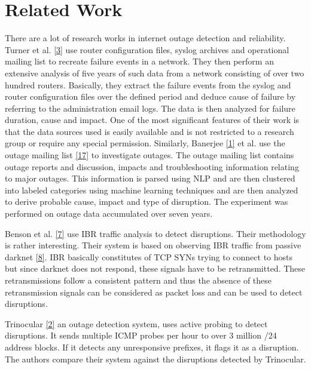 \documentclass[11pt,twoside,a4paper]{article}
\begin{document}
\section{Related Work}\label{RW}
There are a lot of research works in internet outage detection and reliability. Turner et al. \hyperlink {K3} {[3]} use router configuration files, syslog archives and operational mailing list to recreate failure events in a network. They then perform an extensive analysis of five years of such data from a network consisting of over two hundred routers. Basically, they extract the failure events from the syslog and router configuration files over the defined period and deduce cause of failure by referring to the administration email logs. The data is then analyzed for failure duration, cause and impact. One of the most significant features of their work is that the data sources used is easily available and is not restricted to a research group or require any special permission. Similarly, Banerjee \hyperlink {K1} {[1]} et al. use the outage mailing list \hyperlink{K17}{[17]} to investigate outages. The outage mailing list contains outage reports and discussion, impacts and troubleshooting information relating to major outages. This information is parsed using NLP and are then clustered into labeled categories using machine learning techniques and are then analyzed to derive probable cause, impact and type of disruption. The experiment was performed on outage data accumulated over seven years.

Benson et al. \hyperlink {K7} {[7]} use IBR traffic analysis to detect disruptions. Their methodology is rather interesting. Their system is based on observing IBR traffic from passive darknet \hyperlink {K8} {[8]}. IBR basically constitutes of TCP SYNs trying to connect to hosts but since darknet does not respond, these signals have to be retransmitted. These retransmissions follow a consistent pattern and thus the absence of these retransmission signals can be considered as packet loss and can be used to detect disruptions.

Trinocular \hyperlink {K2} {[2]} an outage detection system, uses active probing to detect disruptions. It sends multiple ICMP probes per hour to over 3 million /24 address blocks. If it detects any unresponsive prefixes, it flags it as a disruption. The authors compare their system against the disruptions detected by Trinocular.

\end{document}

